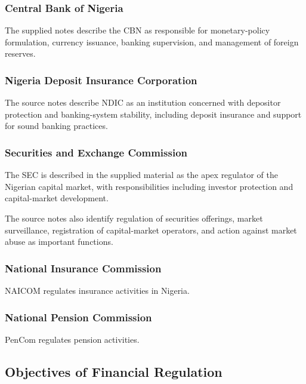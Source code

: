 \documentclass[
]{article}
\begin{document}
\subsubsection{Central Bank of Nigeria}\label{central-bank-of-nigeria}

The supplied notes describe the CBN as responsible for monetary-policy formulation, currency issuance, banking supervision, and management of foreign reserves.

\subsubsection{Nigeria Deposit Insurance Corporation}\label{nigeria-deposit-insurance-corporation}

The source notes describe NDIC as an institution concerned with depositor protection and banking-system stability, including deposit insurance and support for sound banking practices.

\subsubsection{Securities and Exchange Commission}\label{securities-and-exchange-commission}

The SEC is described in the supplied material as the apex regulator of the Nigerian capital market, with responsibilities including investor protection and capital-market development.

The source notes also identify regulation of securities offerings, market surveillance, registration of capital-market operators, and action against market abuse as important functions.

\subsubsection{National Insurance Commission}\label{national-insurance-commission}

NAICOM regulates insurance activities in Nigeria.

\subsubsection{National Pension Commission}\label{national-pension-commission}

PenCom regulates pension activities.

\subsection{Objectives of Financial Regulation}\label{objectives-of-financial-regulation}
\end{document}
